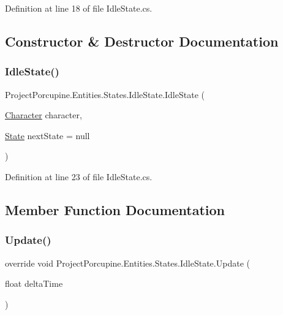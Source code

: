 Definition at line 18 of file Idle\+State.\+cs.



\subsection{Constructor \& Destructor Documentation}
\mbox{\label{class_project_porcupine_1_1_entities_1_1_states_1_1_idle_state_a8a5afae9ecdc2722dfd580958d130b94}} 
\subsubsection{\texorpdfstring{Idle\+State()}{IdleState()}}
{\footnotesize\ttfamily Project\+Porcupine.\+Entities.\+States.\+Idle\+State.\+Idle\+State (\begin{DoxyParamCaption}\item[{\hyperlink{class_project_porcupine_1_1_entities_1_1_character}{Character}}]{character,  }\item[{\hyperlink{class_project_porcupine_1_1_entities_1_1_states_1_1_state}{State}}]{next\+State = {\ttfamily null} }\end{DoxyParamCaption})}



Definition at line 23 of file Idle\+State.\+cs.



\subsection{Member Function Documentation}
\mbox{\label{class_project_porcupine_1_1_entities_1_1_states_1_1_idle_state_acb8508997e5c56a5da15c054a4b691a3}} 
\subsubsection{\texorpdfstring{Update()}{Update()}}
{\footnotesize\ttfamily override void Project\+Porcupine.\+Entities.\+States.\+Idle\+State.\+Update (\begin{DoxyParamCaption}\item[{float}]{delta\+Time }\end{DoxyParamCaption})\hspace{0.3cm}{\ttfamily [virtual]}}



